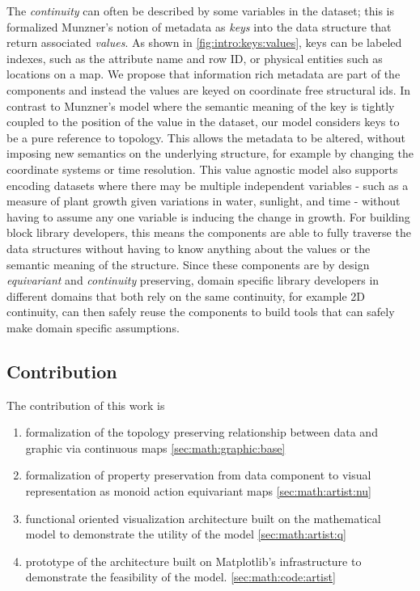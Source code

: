 \documentclass[../main.tex]{subfiles}
\begin{document}
The \textit{continuity} can often be described by some variables in the dataset; this is formalized Munzner's notion of metadata as \textit{keys} into the data structure that return associated \textit{values}\cite{munznerChDataAbstraction}. As shown in \autoref{fig:intro:keys:values}, keys can be labeled indexes, such as the attribute name and row ID, or physical entities such as locations on a map. We propose that information rich metadata are part of the components and instead the values are keyed on coordinate free structural ids. In contrast to Munzner's model where the semantic meaning of the key is tightly coupled to the position of the value in the dataset, our model considers keys to be a pure reference to topology. This allows the metadata to be altered, without imposing new semantics on the underlying structure, for example by changing the coordinate systems or time resolution. This value agnostic model also supports encoding datasets where there may be multiple independent variables - such as a measure of plant growth given variations in water, sunlight, and time - without having to assume any one variable is inducing the change in growth. For building block library developers, this means the components are able to fully traverse the data structures without having to know anything about the values or the semantic meaning of the structure. Since these components are by design \textit{equivariant} and \textit{continuity} preserving, domain specific library developers in different domains that both rely on the same continuity, for example 2D continuity, can then safely reuse the components to build tools that can safely make domain specific assumptions.

\subsection{Contribution}
The contribution of this work is 
\begin{enumerate}
  \item formalization of the topology preserving relationship between data and graphic via continuous maps \autoref{sec:math:graphic:base}
  \item formalization of property preservation from data component to visual representation as monoid action equivariant maps \autoref{sec:math:artist:nu}
  \item functional oriented visualization architecture built on the mathematical model to demonstrate the utility of the model \autoref{sec:math:artist:q}
  \item prototype of the architecture built on Matplotlib's infrastructure to demonstrate the feasibility of the model. \autoref{sec:math:code:artist}
\end{enumerate}
\end{document}
